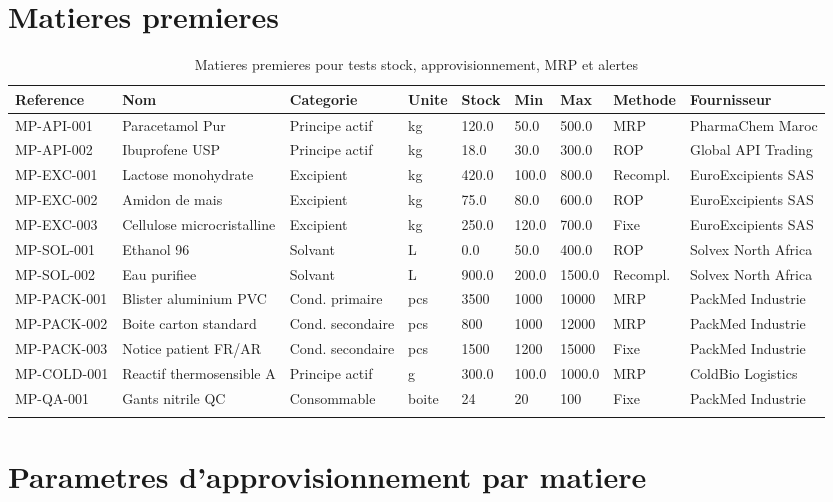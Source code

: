 \documentclass[11pt,a4paper]{article}
\begin{document}
\section{Matieres premieres}

\begin{longtable}{|p{2.2cm}|p{3cm}|p{2.4cm}|p{1.2cm}|p{1.6cm}|p{1.6cm}|p{1.6cm}|p{1.8cm}|p{2cm}|}
\hline
\textbf{Reference} & \textbf{Nom} & \textbf{Categorie} & \textbf{Unite} & \textbf{Stock} & \textbf{Min} & \textbf{Max} & \textbf{Methode} & \textbf{Fournisseur} \\
\hline
MP-API-001 & Paracetamol Pur & Principe actif & kg & 120.0 & 50.0 & 500.0 & MRP & PharmaChem Maroc \\
\hline
MP-API-002 & Ibuprofene USP & Principe actif & kg & 18.0 & 30.0 & 300.0 & ROP & Global API Trading \\
\hline
MP-EXC-001 & Lactose monohydrate & Excipient & kg & 420.0 & 100.0 & 800.0 & Recompl. & EuroExcipients SAS \\
\hline
MP-EXC-002 & Amidon de mais & Excipient & kg & 75.0 & 80.0 & 600.0 & ROP & EuroExcipients SAS \\
\hline
MP-EXC-003 & Cellulose microcristalline & Excipient & kg & 250.0 & 120.0 & 700.0 & Fixe & EuroExcipients SAS \\
\hline
MP-SOL-001 & Ethanol 96 & Solvant & L & 0.0 & 50.0 & 400.0 & ROP & Solvex North Africa \\
\hline
MP-SOL-002 & Eau purifiee & Solvant & L & 900.0 & 200.0 & 1500.0 & Recompl. & Solvex North Africa \\
\hline
MP-PACK-001 & Blister aluminium PVC & Cond. primaire & pcs & 3500 & 1000 & 10000 & MRP & PackMed Industrie \\
\hline
MP-PACK-002 & Boite carton standard & Cond. secondaire & pcs & 800 & 1000 & 12000 & MRP & PackMed Industrie \\
\hline
MP-PACK-003 & Notice patient FR/AR & Cond. secondaire & pcs & 1500 & 1200 & 15000 & Fixe & PackMed Industrie \\
\hline
MP-COLD-001 & Reactif thermosensible A & Principe actif & g & 300.0 & 100.0 & 1000.0 & MRP & ColdBio Logistics \\
\hline
MP-QA-001 & Gants nitrile QC & Consommable & boite & 24 & 20 & 100 & Fixe & PackMed Industrie \\
\hline
\caption{Matieres premieres pour tests stock, approvisionnement, MRP et alertes}
\end{longtable}

\section{Parametres d'approvisionnement par matiere}
\end{document}
